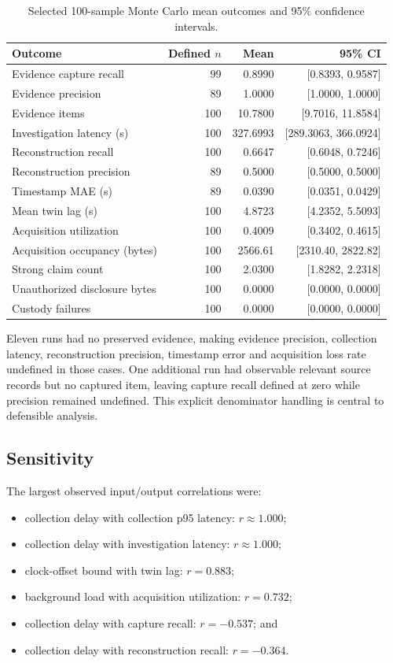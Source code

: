﻿\documentclass[11pt,a4paper]{article}
\begin{document}
\begin{table}[H]
\centering
\caption{Selected 100-sample Monte Carlo mean outcomes and 95\% confidence intervals.}
\label{tab:mc}
\begin{tabular}{@{}l r r r@{}}
\toprule
Outcome & Defined $n$ & Mean & 95\% CI \\
\midrule
Evidence capture recall & 99 & 0.8990 & [0.8393, 0.9587] \\
Evidence precision & 89 & 1.0000 & [1.0000, 1.0000] \\
Evidence items & 100 & 10.7800 & [9.7016, 11.8584] \\
Investigation latency (s) & 100 & 327.6993 & [289.3063, 366.0924] \\
Reconstruction recall & 100 & 0.6647 & [0.6048, 0.7246] \\
Reconstruction precision & 89 & 0.5000 & [0.5000, 0.5000] \\
Timestamp MAE (s) & 89 & 0.0390 & [0.0351, 0.0429] \\
Mean twin lag (s) & 100 & 4.8723 & [4.2352, 5.5093] \\
Acquisition utilization & 100 & 0.4009 & [0.3402, 0.4615] \\
Acquisition occupancy (bytes) & 100 & 2566.61 & [2310.40, 2822.82] \\
Strong claim count & 100 & 2.0300 & [1.8282, 2.2318] \\
Unauthorized disclosure bytes & 100 & 0.0000 & [0.0000, 0.0000] \\
Custody failures & 100 & 0.0000 & [0.0000, 0.0000] \\
\bottomrule
\end{tabular}
\end{table}

Eleven runs had no preserved evidence, making evidence precision, collection latency, reconstruction precision, timestamp error and acquisition loss rate undefined in those cases. One additional run had observable relevant source records but no captured item, leaving capture recall defined at zero while precision remained undefined. This explicit denominator handling is central to defensible analysis.

\subsection{Sensitivity}

The largest observed input/output correlations were:

\begin{itemize}
  \item collection delay with collection p95 latency: $r\approx1.000$;
  \item collection delay with investigation latency: $r\approx1.000$;
  \item clock-offset bound with twin lag: $r=0.883$;
  \item background load with acquisition utilization: $r=0.732$;
  \item collection delay with capture recall: $r=-0.537$; and
  \item collection delay with reconstruction recall: $r=-0.364$.
\end{itemize}
\end{document}
